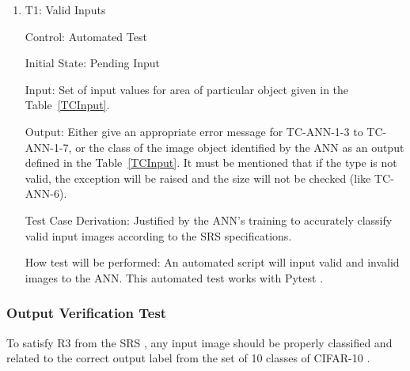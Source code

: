 \documentclass[12pt, titlepage]{article}
\begin{document}
\begin{enumerate}

  \item{T1: Valid Inputs\\} 

  Control: Automated Test
  
  Initial State: Pending Input
  
  Input: Set of input values for area of particular object given in the Table~\ref{TCInput}.
  
  Output: Either give an appropriate error message for TC-ANN-1-3 to TC-ANN-1-7,
  or the class of the image object identified by the ANN as an output defined in the Table~\ref{TCInput}. 
  It must be mentioned that if the type is not valid, the exception will be raised and the size will not 
  be checked (like TC-ANN-6).

  Test Case Derivation: Justified by the ANN's training to accurately classify 
  valid input images according to the 
  SRS \citep{SRS} specifications.

  How test will be performed: An automated script will input valid and invalid images to the ANN. 
  This automated test works with Pytest \citep{pytest}.

\end{enumerate}

\subsubsection{Output Verification Test} \label{OutputVerificationTest}
To satisfy R3 from the 
SRS \citep{SRS}, any input image 
should be properly classified and related to the correct output label
from the set of 10 classes of CIFAR-10 \citep{CIFAR10}.
\end{document}
